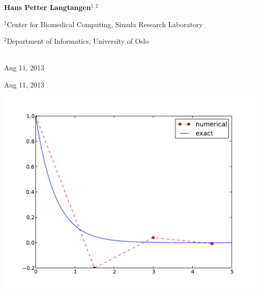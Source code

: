 \documentclass[%
oneside,                 %
final,                   %
10pt]{article}
\begin{document}
\begin{center}
\author{Hans Petter Langtangen}

\begin{center}
{\bf Hans Petter Langtangen${}^{1, 2}$} \\ [0mm]
\end{center}

\begin{center}
\centerline{{\small ${}^1$Center for Biomedical Computing, Simula Research Laboratory}}
\centerline{{\small ${}^2$Department of Informatics, University of Oslo}}
\end{center}


\date{Aug 11, 2013}
\maketitle
\date{Aug 11, 2013
}

\ \\ [10mm]
{\large\textsf{Aug 11, 2013}}

\end{center}
\vfill
\clearpage

\begin{center}
Aug 11, 2013
\end{center}

\vspace{1cm}



\begin{center}  %
  \centerline{\includegraphics[width=0.4\linewidth]{../doc/slides/fig/CN_logo.pdf}}
\end{center}



\end{document}
